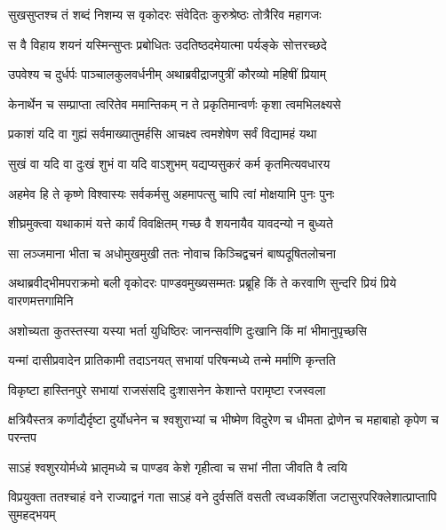 
\twolineshloka
{सुखसुप्तश्च तं शब्दं निशम्य स वृकोदरः}
{संवेदितः कुरुश्रेष्ठः तोत्रैरिव महागजः}


\twolineshloka
{स वै विहाय शयनं यस्मिन्सुप्तः प्रबोधितः}
{उदतिष्ठदमेयात्मा पर्यङ्के सोत्तरच्छदे}


\twolineshloka
{उपवेश्य च दुर्धर्पः पाञ्चालकुलवर्धनीम्}
{अथाब्रवीद्राजपुत्रीं कौरव्यो महिषीं प्रियाम्}


\twolineshloka
{केनार्थेन च सम्प्राप्ता त्वरितेव ममान्तिकम्}
{न ते प्रकृतिमान्वर्णः कृशा त्वमभिलक्ष्यसे}


\twolineshloka
{प्रकाशं यदि वा गुह्यं सर्वमाख्यातुमर्हसि}
{आचक्ष्व त्वमशेषेण सर्वं विद्यामहं यथा}


\twolineshloka
{सुखं वा यदि वा दुःखं शुभं वा यदि वाऽशुभम्}
{यद्यप्यसुकरं कर्म कृतमित्यवधारय}


\twolineshloka
{अहमेव हि ते कृष्णे विश्वास्यः सर्वकर्मसु}
{अहमापत्सु चापि त्वां मोक्षयामि पुनः पुनः}


\twolineshloka
{शीघ्रमुक्त्वा यथाकामं यत्ते कार्यं विवक्षितम्}
{गच्छ वै शयनायैव यावदन्यो न बुध्यते}



\twolineshloka
{सा लञ्जमाना भीता च अधोमुखमुखी ततः}
{नोवाच किञ्चिद्वचनं बाष्पदूषितलोचना}


\twolineshloka
{अथाब्रवीद्भीमपराक्रमो बली वृकोदरः पाण्डवमुख्यसम्मतः}
{प्रब्रूहि किं ते करवाणि सुन्दरि प्रियं प्रिये वारणमत्तगामिनि}




\twolineshloka
{अशोच्यता कुतस्तस्या यस्या भर्ता युधिष्ठिरः}
{जानन्सर्वाणि दुःखानि किं मां भीमानुपृच्छसि}


\twolineshloka
{यन्मां दासीप्रवादेन प्रातिकामी तदाऽनयत्}
{सभायां परिषन्मध्ये तन्मे मर्माणि कृन्तति}


\twolineshloka
{विकृष्टा हास्तिनपुरे सभायां राजसंसदि}
{दुःशासनेन केशान्ते परामृष्टा रजस्वला}


\threelineshloka
{क्षत्रियैस्तत्र कर्णाद्यैर्दृष्टा दुर्योधनेन च}
{श्वशुराभ्यां च भीष्मेण विदुरेण च धीमता}
{द्रोणेन च महाबाहो कृपेण च परन्तप}


\twolineshloka
{साऽहं श्वशुरयोर्मध्ये भ्रातृमध्ये च पाण्डव}
{केशे गृहीत्वा च सभां नीता जीवति वै त्वयि}


\threelineshloka
{विप्रयुक्ता ततश्चाहं वने राज्याद्वनं गता}
{साऽहं वने दुर्वसतिं वसती त्वध्वकर्शिता}
{जटासुरपरिक्लेशात्प्राप्तापि सुमहद्भयम्}


